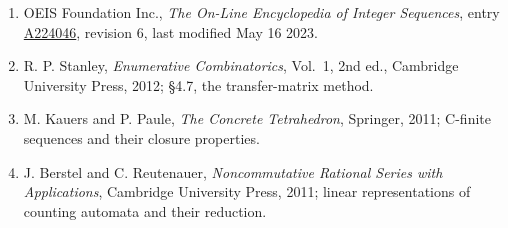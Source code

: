 \documentclass[11pt]{article}
\theoremstyle{definition}
\begin{document}
\begin{enumerate}

\item OEIS Foundation Inc., \emph{The On-Line Encyclopedia of Integer Sequences}, entry \href{https://oeis.org/A224046}{A224046}, revision 6, last modified May 16 2023.

\item R. P. Stanley, \emph{Enumerative Combinatorics}, Vol.~1, 2nd ed., Cambridge University Press, 2012; \S4.7, the transfer-matrix method.

\item M. Kauers and P. Paule, \emph{The Concrete Tetrahedron}, Springer, 2011; C-finite sequences and their closure properties.

\item J. Berstel and C. Reutenauer, \emph{Noncommutative Rational Series with Applications}, Cambridge University Press, 2011; linear representations of counting automata and their reduction.

\end{enumerate}
\end{document}
